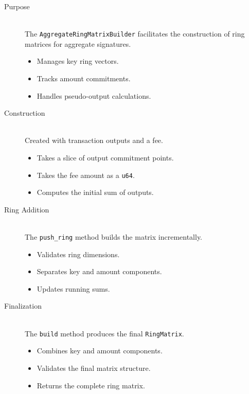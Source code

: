 \documentclass[12pt,a4paper]{article}
\begin{document}
\begin{description}
\item[Purpose] \hfill \\
The \texttt{AggregateRingMatrixBuilder} facilitates the construction of ring matrices for aggregate signatures.
\begin{itemize}
\item Manages key ring vectors.
\item Tracks amount commitments.
\item Handles pseudo-output calculations.
\end{itemize}

\item[Construction] \hfill \\
Created with transaction outputs and a fee. %
\begin{itemize}
\item Takes a slice of output commitment points.
\item Takes the fee amount as a \texttt{u64}.
\item Computes the initial sum of outputs. %
\end{itemize}

\item[Ring Addition] \hfill \\
The \texttt{push\_ring} method builds the matrix incrementally. %
\begin{itemize}
\item Validates ring dimensions.
\item Separates key and amount components.
\item Updates running sums.
\end{itemize}

\item[Finalization] \hfill \\
The \texttt{build} method produces the final \texttt{RingMatrix}. %
\begin{itemize}
\item Combines key and amount components.
\item Validates the final matrix structure.
\item Returns the complete ring matrix.
\end{itemize}
\end{description}
\end{document}

